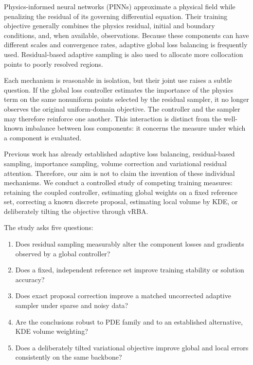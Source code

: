 \documentclass[
  11pt,
]{article}
\providecommand{\tightlist}{%
  \setlength{\itemsep}{0pt}\setlength{\parskip}{0pt}}
\begin{document}
Physics-informed neural networks (PINNs) approximate a physical field
while penalizing the residual of its governing differential equation.
Their training objective generally combines the physics residual,
initial and boundary conditions, and, when available, observations.
Because these components can have different scales and convergence
rates, adaptive global loss balancing is frequently used. Residual-based
adaptive sampling is also used to allocate more collocation points to
poorly resolved regions.

Each mechanism is reasonable in isolation, but their joint use raises a
subtle question. If the global loss controller estimates the importance
of the physics term on the same nonuniform points selected by the
residual sampler, it no longer observes the original uniform-domain
objective. The controller and the sampler may therefore reinforce one
another. This interaction is distinct from the well-known imbalance
between loss components: it concerns the measure under which a component
is evaluated.

Previous work has already established adaptive loss balancing,
residual-based sampling, importance sampling, volume correction and
variational residual attention. Therefore, our aim is not to claim the
invention of these individual mechanisms. We conduct a controlled study
of competing training measures: retaining the coupled controller,
estimating global weights on a fixed reference set, correcting a known
discrete proposal, estimating local volume by KDE, or deliberately
tilting the objective through vRBA.

The study asks five questions:

\begin{enumerate}
\def\labelenumi{\arabic{enumi}.}
\tightlist
\item
  Does residual sampling measurably alter the component losses and
  gradients observed by a global controller?
\item
  Does a fixed, independent reference set improve training stability or
  solution accuracy?
\item
  Does exact proposal correction improve a matched uncorrected adaptive
  sampler under sparse and noisy data?
\item
  Are the conclusions robust to PDE family and to an established
  alternative, KDE volume weighting?
\item
  Does a deliberately tilted variational objective improve global and
  local errors consistently on the same backbone?
\end{enumerate}
\end{document}
